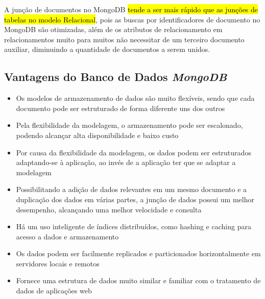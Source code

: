 A junção de documentos no MongoDB \hl{tende a ser mais rápido que as junções de tabelas no modelo Relacional}, pois as buscas por identificadores de documento no MongoDB são otimizadas, além de os atributos de relacionamento em relacionamentos muito para muitos não necessitar de um terceiro documento auxiliar, diminuindo a quantidade de documentos a serem unidos.


\subsection{Vantagens do Banco de Dados \textit{MongoDB}}

    
\begin{itemize}
    \item Os modelos de armazenamento de dados são muito flexíveis, sendo que cada documento pode ser estruturado de forma diferente uns dos outros
    
    \item Pela flexibilidade da modelagem, o armazenamento pode ser escalonado, podendo alcançar alta disponibilidade e baixo custo
    
    \item Por causa da flexibilidade da modelagem, os dados podem ser estruturados adaptando-se à aplicação, ao invés de a aplicação ter que se adaptar a modelagem
    
    \item Possibilitando a adição de dados relevantes em um mesmo documento e a duplicação dos dados em várias partes, a junção de dados possui um melhor desempenho, alcançando uma melhor velocidade e consulta
    
    \item Há um uso inteligente de índices distribuídos, como hashing e caching para acesso a dados e armazenamento
    
    \item Os dados podem ser facilmente replicados e particionados horizontalmente em servidores locais e remotos
    
    \item Fornece uma estrutura de dados muito similar e familiar com o tratamento de dados de aplicações web
\end{itemize}
    

